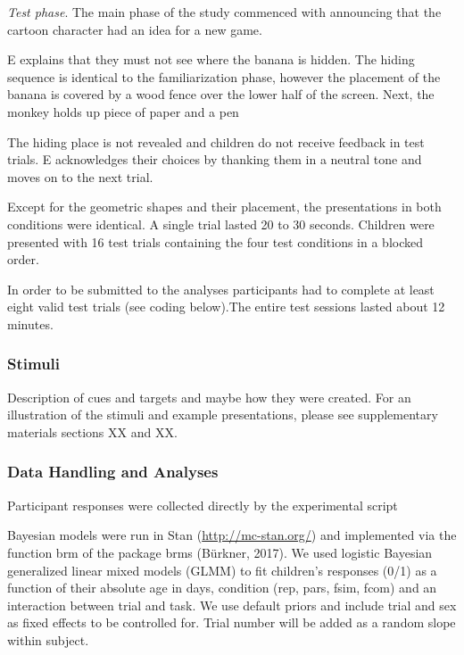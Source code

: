 \documentclass[
  man]{apa6}
\begin{document}
\emph{Test phase}. The main phase of the study commenced with announcing that the cartoon character had an idea for a new game.

E explains that they must not see where the banana is hidden. The hiding sequence is identical to the familiarization phase, however the placement of the banana is covered by a wood fence over the lower half of the screen. Next, the monkey holds up piece of paper and a pen

The hiding place is not revealed and children do not receive feedback in test trials. E acknowledges their choices by thanking them in a neutral tone and moves on to the next trial.

Except for the geometric shapes and their placement, the presentations in both conditions were identical. A single trial lasted 20 to 30 seconds. Children were presented with 16 test trials containing the four test conditions in a blocked order.

In order to be submitted to the analyses participants had to complete at least eight valid test trials (see coding below).The entire test sessions lasted about 12 minutes.

\subsubsection{Stimuli}\label{stimuli}

Description of cues and targets and maybe how they were created. For an illustration of the stimuli and example presentations, please see supplementary materials sections XX and XX.

\subsubsection{Data Handling and Analyses}\label{data-handling-and-analyses}

Participant responses were collected directly by the experimental script

Bayesian models were run in Stan (\url{http://mc-stan.org/}) and implemented via the function brm of the package brms (Bürkner, 2017). We used logistic Bayesian generalized linear mixed models (GLMM) to fit children's responses (0/1) as a function of their absolute age in days, condition (rep, pars, fsim, fcom) and an interaction between trial and task. We use default priors and include trial and sex as fixed effects to be controlled for. Trial number will be added as a random slope within subject.
\end{document}
